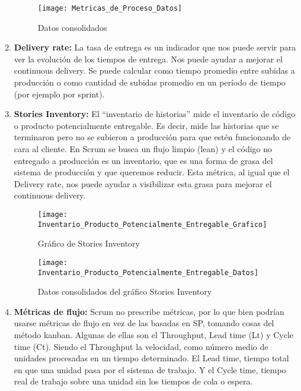 \begin{enumerate}
  \begin{figure}[h]
  \centering
  \texttt{[image: Metricas\_de\_Proceso\_Datos]}
  \caption{Datos consolidados}
  \centering
  \label{fig:Metricas_de_Proceso_Datos} %
  \end{figure}
  \FloatBarrier

\item {\textbf{Delivery rate:} La tasa de entrega es un indicador que nos puede servir para ver la evolución de los tiempos de entrega. Nos puede ayudar a mejorar el continuous delivery. Se puede calcular como tiempo promedio entre subidas a producción o como cantidad de subidas promedio en un período de tiempo (por ejemplo por sprint).
}

\item {\textbf{Stories Inventory:} El “inventario de historias” mide el inventario de código o producto potencialmente entregable. Es decir, mide las historias que se terminaron pero no se subieron a producción para que estén funcionando de cara al cliente. En Scrum se busca un flujo limpio (lean) y el código no entregado a producción es un inventario, que es una forma de grasa del sistema de producción y que queremos reducir. Esta métrica, al igual que el Delivery rate, nos puede ayudar a visibilizar esta grasa para mejorar el continuous delivery.
}

  \begin{figure}[h]
  \centering
  \texttt{[image: Inventario\_Producto\_Potencialmente\_Entregable\_Grafico]}
  \caption{Gráfico de Stories Inventory}
  \centering
  \label{fig:Inventario_Producto_Potencialmente_Entregable_Grafico} %
  \end{figure}
  \FloatBarrier

  \begin{figure}[h]
  \centering
  \texttt{[image: Inventario\_Producto\_Potencialmente\_Entregable\_Datos]}
  \caption{Datos consolidados del gráfico Stories Inventory}
  \centering
  \label{fig:Inventario_Producto_Potencialmente_Entregable_Datos} %
  \end{figure}
  \FloatBarrier


\item {\textbf{Métricas de flujo:} Scrum no prescribe métricas, por lo que bien podrían usarse métricas de flujo en vez de las basadas en SP, tomando cosas del método kanban. Algunas de ellas son el Throughput, Lead time (Lt) y Cycle time (Ct). Siendo el Throughput la velocidad, como número medio de unidades procesadas en un tiempo determinado. El Lead time, tiempo total en que una unidad pasa por el sistema de trabajo. Y el Cycle time, tiempo real de trabajo sobre una unidad sin los tiempos de cola o espera.
}

\end{enumerate}

